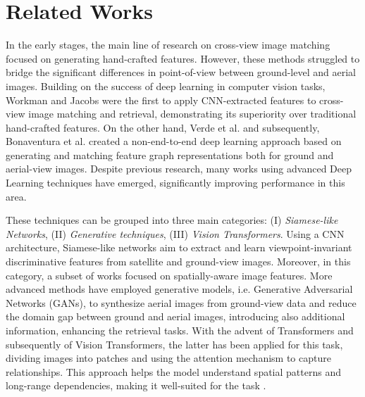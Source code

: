\section{Related Works}
In the early stages, the main line of research on cross-view image matching focused on generating hand-crafted features\cite{manual1,manual2}. However, these methods struggled to bridge the significant differences in point-of-view between ground-level and aerial images. 
Building on the success of deep learning in computer vision tasks, Workman and Jacobs \cite{Jacob} were the first to apply CNN-extracted features to cross-view image matching and retrieval, demonstrating its superiority over traditional hand-crafted features. On the other hand, Verde et al.\cite{9170787} and subsequently, Bonaventura et al.\cite{10167940} created a non-end-to-end deep learning approach based on generating and matching feature graph representations both for ground and aerial-view images. Despite previous research, many works using advanced Deep Learning techniques have emerged, significantly improving performance in this area.

These techniques can be grouped into three main categories: (I) \textit{Siamese-like Networks}, (II) \textit{Generative techniques}, (III) \textit{Vision Transformers}. Using a CNN architecture, Siamese-like networks aim to extract and learn viewpoint-invariant discriminative features from satellite and ground-view images. Moreover, in this category, a subset of works focused on spatially-aware image features\cite{shi2019optimalfeaturetransportcrossview, shi2020ilookingatjoint,pro2024}. More advanced methods have employed generative models, i.e. Generative Adversarial Networks (GANs)\cite{goodfellow2014generativeadversarialnetworks}, to synthesize aerial images from ground-view data and reduce the domain gap between ground and aerial images, introducing also additional information, enhancing the retrieval tasks\cite{regmi2018,deng2019,toker2021}. With the advent of Transformers\cite{vaswani2023attentionneed} and subsequently of Vision Transformers\cite{dosovitskiy2021imageworth16x16words}, the latter has been applied for this task, dividing images into patches and using the attention mechanism to capture relationships. This approach helps the model understand spatial patterns and long-range dependencies, making it well-suited for the task \cite{zhu2022, yang2021, zhang2022}.

